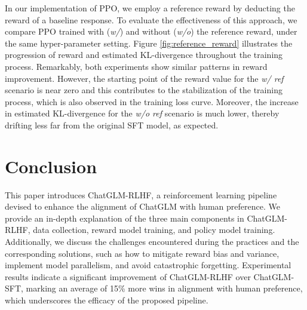  In our implementation of PPO, we employ a reference reward by deducting the reward of a baseline response. To evaluate the effectiveness of this approach, we compare PPO trained with (\textit{w/}) and without (\textit{w/o}) the reference reward, under the same hyper-parameter setting. Figure \ref{fig:reference_reward} illustrates the progression of reward and estimated KL-divergence throughout the training process. Remarkably, both experiments show similar patterns in reward improvement. However, the starting point of the reward value for the \textit{w/ ref} scenario is near zero and this contributes to the stabilization of the training process, which is also observed in the training loss curve. Moreover, the increase in estimated KL-divergence for the \textit{w/o ref} scenario is much lower, thereby drifting less far from the original SFT model, as expected.


\section{Conclusion}
This paper introduces ChatGLM-RLHF, a reinforcement learning pipeline devised to enhance the alignment of ChatGLM with human preference.
We provide an in-depth explanation of the three main components in ChatGLM-RLHF, data collection, reward model training, and policy model training.
Additionally, we discuss the challenges encountered during the practices and the corresponding solutions, such as how to mitigate reward bias and variance, implement model parallelism, and avoid catastrophic forgetting. Experimental results indicate a significant improvement of ChatGLM-RLHF over ChatGLM-SFT, marking an average of 15\% more wins in alignment with human preference, which underscores the efficacy of the proposed pipeline.

